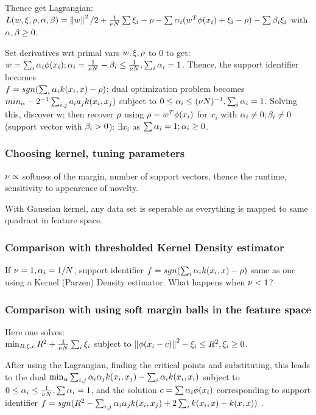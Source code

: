 \documentclass[10pt]{amsart}
\begin{document}
Thence get Lagrangian: $L(w, \gx, \gr, \ga, \gb) =  \norm{w}^{2}/2 + \frac{1}{\gn N} \sum \gx_{i} - \gr - \sum \ga_{i}(w^{T}\gf(x_{i}) + \gx_{i} - \gr) - \sum \gb_{i}\gx_{i}$ with $\ga, \gb \geq 0$.

Set derivatives wrt primal vars $w, \gx, \gr$ to 0 to get: $w = \sum_{i}\ga_{i}\gf(x_{i}); \ga_{i} = \frac{1}{\gn N} - \gb_{i} \leq \frac{1}{\gn N}, \sum_{i} \ga_{i} = 1$. Thence, the support identifier becomes \\
$f = sgn(\sum_{i}\ga_{i}k(x_{i},x) - \gr)$; dual optimization problem becomes \\
$min_{\ga} - 2^{-1} \sum_{i,j}a_{i}a_{j}k(x_{i}, x_{j})$ subject to $0 \leq \ga_{i} \leq (\gn N)^{-1}, \sum_{i}\ga_{i} =1$. Solving this, discover w; then recover $\gr$ using $\gr = w^{T}\gf(x_{i})$ for $x_{i}$ with $\ga_{i} \neq 0; \gb_{i} \neq 0$ (support vector with $\gb_{i} > 0$): $\exists x_{i}$ as $\sum \ga_{i} = 1; \ga_{i} \geq 0$.

\subsubsection{Choosing kernel, tuning parameters}
$\gn \propto$ softness of the margin, number of support vectors, thence the runtime, sensitivity to appearence of novelty.

With Gaussian kernel, any data set is seperable as everything is mapped to same quadrant in feature space.

\subsubsection{Comparison with thresholded Kernel Density estimator}
If $\gn = 1, \ga_{i} = 1/N$, support identifier $f = sgn(\sum_{i}\ga_{i}k(x_{i},x) - \gr)$ same as one using a Kernel (Parzen) Density estimator. What happens when $\gn < 1$?

\subsubsection{Comparison with using soft margin balls in the feature space}
Here one solves: \\
$\min_{R, \gx, c} R^{2} + \frac{1}{\gn N} \sum_{i}\gx_{i}$ subject to $\norm{\gf(x_{i} - c)}^{2}  - \gx_{i}\leq R^{2}, \gx_{i}\geq 0$.

After using the Lagrangian, finding the critical points and substituting, this leads to the dual $\min_{\ga}\sum_{i,j}\ga_{i}\ga_{j}k(x_{i}, x_{j}) - \sum_{i}\ga_{i}k(x_{i}, x_{i})$ subject to $0 \leq \ga_{i} \leq \frac{1}{\gn N}, \sum \ga_{i} = 1$, and the solution $c = \sum \ga_{i}\gf(x_{i})$ corresponding to support identifier $f = sgn(R^{2} - \sum_{i,j}\ga_{i}\ga_{j}k(x_{i}, x_{j}) + 2\sum_{i}k(x_{i}, x)- k(x,x) )$ \chk.
\end{document}
